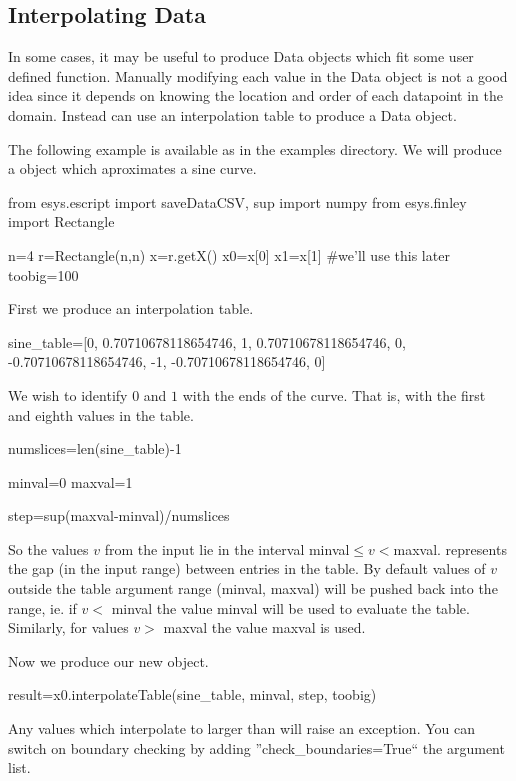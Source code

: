 \subsection{Interpolating Data}
In some cases, it may be useful to produce Data objects which fit some user defined function.
Manually modifying each value in the Data object is not a good idea since it depends on 
knowing the location and order of each datapoint in the domain.
Instead \escript can use an interpolation table to produce a Data object.

The following example is available as  in the examples directory.
We will produce a \Data object which aproximates a sine curve.

\begin{python}
from esys.escript import saveDataCSV, sup
import numpy
from esys.finley import Rectangle

n=4
r=Rectangle(n,n)
x=r.getX()
x0=x[0]
x1=x[1]    #we'll use this later
toobig=100	
\end{python}

First we produce an interpolation table.
\begin{python}
sine_table=[0, 0.70710678118654746, 1, 0.70710678118654746, 0, 
           -0.70710678118654746, -1, -0.70710678118654746, 0]
\end{python}

We wish to identify $0$ and $1$ with the ends of the curve.
That is, with the first and eighth values in the table. 

\begin{python}
numslices=len(sine_table)-1

minval=0
maxval=1

step=sup(maxval-minval)/numslices
\end{python}

So the values $v$ from the input lie in the interval minval$\leq v < $maxval.
 represents the gap (in the input range) between entries in the table.
By default values of $v$ outside the table argument range (minval, maxval) will
be pushed back into the range, ie. if $v <$ minval the value minval will be used to
evaluate the table. Similarly, for values $v>$ maxval the value maxval is used.

Now we produce our new \Data object.

\begin{python}
result=x0.interpolateTable(sine_table, minval, step, toobig)
\end{python}
Any values which interpolate to larger than  will raise an exception. You can 
switch on boundary checking by adding ''check_boundaries=True`` the argument list.


